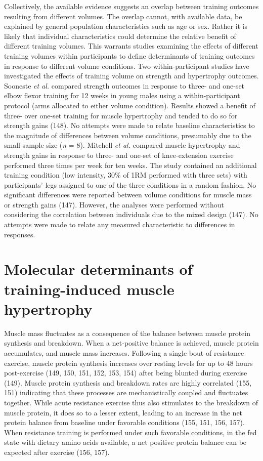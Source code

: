 \documentclass[twoside,10pt]{gihclass} %
\begin{document}
Collectively, the available evidence suggests an overlap between training outcomes resulting from different volumes.
The overlap cannot, with available data, be explained by general population characteristics such as age or sex.
Rather it is likely that individual characteristics could determine the relative benefit of different training volumes.
This warrants studies examining the effects of different training volumes within participants to define determinants of training outcomes in response to different volume conditions.
Two within-participant studies have investigated the effects of training volume on strength and hypertrophy outcomes.
Sooneste \emph{et al.} compared strength outcomes in response to three- and one-set elbow flexor training for 12 weeks in young males using a within-participant protocol (arms allocated to either volume condition).
Results showed a benefit of three- over one-set training for muscle hypertrophy and tended to do so for strength gains (148).
No attempts were made to relate baseline characteristics to the magnitude of differences between volume conditions, presumably due to the small sample size (\emph{n} = 8).
Mitchell \emph{et al.} compared muscle hypertrophy and strength gains in response to three- and one-set of knee-extension exercise performed three times per week for ten weeks.
The study contained an additional training condition (low intensity, 30\% of 1RM performed with three sets) with participants' legs assigned to one of the three conditions in a random fashion.
No significant differences were reported between volume conditions for muscle mass or strength gains (147).
However, the analyses were performed without considering the correlation between individuals due to the mixed design (147).
No attempts were made to relate any measured characteristic to differences in responses.

\hypertarget{molecular-determinants-of-training-induced-muscle-hypertrophy}{%
\section{Molecular determinants of training-induced muscle hypertrophy}\label{molecular-determinants-of-training-induced-muscle-hypertrophy}}

Muscle mass fluctuates as a consequence of the balance between muscle protein synthesis and breakdown. When a net-positive balance is achieved, muscle protein accumulates, and muscle mass increases.
Following a single bout of resistance exercise, muscle protein synthesis increases
over resting levels for up to 48 hours post-exercise
(149, 150, 151, 152, 153, 154)
after being blunted during exercise
(149).
Muscle protein synthesis and breakdown rates are highly correlated
(155, 151)
indicating that these processes are mechanistically coupled and fluctuates together.
While acute resistance exercise thus also stimulates to the breakdown of muscle protein, it does so to a lesser extent, leading to an increase in the net protein balance from baseline under favorable conditions
(155, 151, 156, 157).
When resistance training is performed under such favorable conditions, in the fed state with dietary amino acids available, a net positive protein balance can be expected after exercise
(156, 157).
\end{document}
